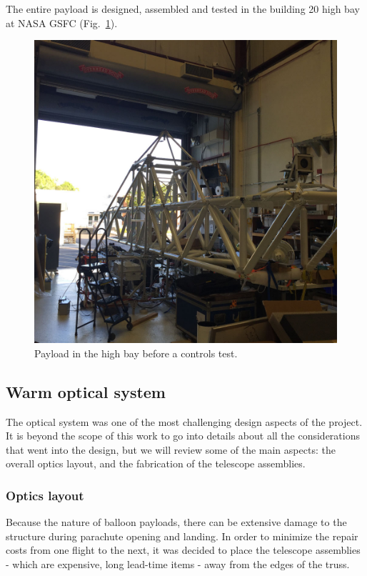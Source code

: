 The entire payload is designed, assembled and tested in the building 20 high bay at NASA GSFC (Fig.~\ref{fig:HighBayOpen}).
\begin{figure}[!h]
		\centering
		\includegraphics[width=\textwidth]{Figures/HighBayOpen.jpg} 
		\caption[Payload in high bay]{Payload in the high bay before a controls test.}
		\label{fig:HighBayOpen}
\end{figure}


\subsection{Warm optical system}

The optical system was one of the most challenging design aspects of the project. It is beyond the scope of this work to go into details about all the considerations that went into the design, but we will review some of the main aspects: the overall optics layout, and the fabrication of the telescope assemblies.

\subsubsection{Optics layout}
Because the nature of balloon payloads, there can be extensive damage to the structure during parachute opening and landing. In order to minimize the repair costs from one flight to the next, it was decided to place the telescope assemblies - which are expensive, long lead-time items - away from the edges of the truss. 

